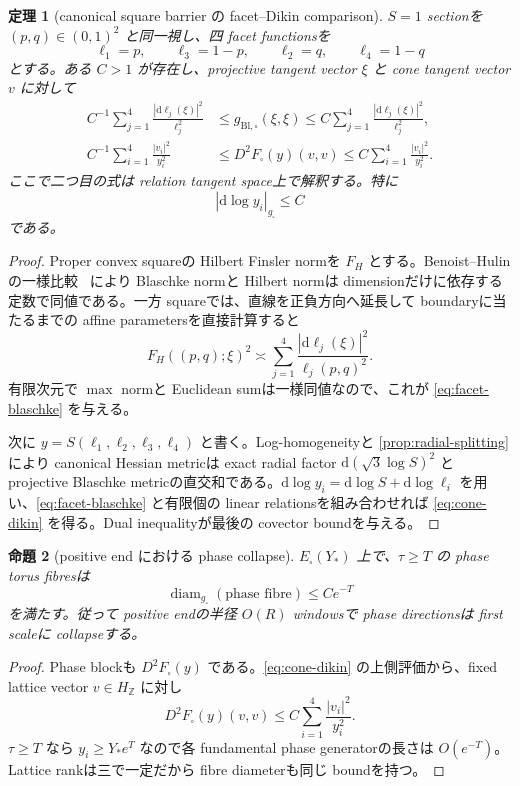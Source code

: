 \documentclass[11pt,a4paper]{ltjsarticle}
\newcommand{\ZZ}{\mathbb Z}\newcommand{\dd}{\mathrm d}\newcommand{\Ric}{\operatorname{Ric}}
\newcommand{\diam}{\operatorname{diam}}\newcommand{\vol}{\operatorname{vol}}
\newcommand{\gsq}{g_{\square}}\newcommand{\omsq}{\omega_{\square}}
\newcommand{\Fbox}{F_{\square}}\newcommand{\ddc}{\sqrt{-1}\,\partial\bar\partial}
\theoremstyle{plain}
\newtheorem{theorem}{定理}[section]\newtheorem{proposition}[theorem]{命題}
\theoremstyle{definition}
\theoremstyle{remark}
\begin{document}
\begin{theorem}[canonical square barrier の facet--Dikin comparison]\label{thm:square-dikin}
$S=1$ sectionを $(p,q)\in(0,1)^2$ と同一視し、四 facet functionsを
\[
 \ell_1=p,\qquad \ell_3=1-p,\qquad
 \ell_2=q,\qquad \ell_4=1-q
\]
とする。ある $C>1$ が存在し、projective tangent vector $\xi$ と cone tangent vector $v$ に対して
\begin{align}
 C^{-1}\sum_{j=1}^4\frac{|\dd\ell_j(\xi)|^2}{\ell_j^2}
 &\le g_{\mathrm{Bl},\square}(\xi,\xi)
 \le C\sum_{j=1}^4\frac{|\dd\ell_j(\xi)|^2}{\ell_j^2},\label{eq:facet-blaschke}\\
 C^{-1}\sum_{i=1}^4\frac{|v_i|^2}{y_i^2}
 &\le D^2\Fbox(y)(v,v)
 \le C\sum_{i=1}^4\frac{|v_i|^2}{y_i^2}.\label{eq:cone-dikin}
\end{align}
ここで二つ目の式は relation tangent space上で解釈する。特に
\[
 |\dd\log y_i|_{\gsq}\le C
\]
である。
\end{theorem}

\begin{proof}
Proper convex squareの Hilbert Finsler normを $F_H$ とする。Benoist--Hulin の一様比較~\cite{BHulin,Tholozan} により Blaschke normと Hilbert normは dimensionだけに依存する定数で同値である。一方 squareでは、直線を正負方向へ延長して boundaryに当たるまでの affine parametersを直接計算すると
\[
 F_H((p,q);\xi)^2\asymp
 \sum_{j=1}^4\frac{|\dd\ell_j(\xi)|^2}{\ell_j(p,q)^2}.
\]
有限次元で $\max$ normと Euclidean sumは一様同値なので、これが \eqref{eq:facet-blaschke} を与える。

次に $y=S(\ell_1,\ell_2,\ell_3,\ell_4)$ と書く。Log-homogeneityと \cref{prop:radial-splitting} により canonical Hessian metricは exact radial factor $\dd(\sqrt3\log S)^2$ と projective Blaschke metricの直交和である。$\dd\log y_i=\dd\log S+\dd\log\ell_i$ を用い、\eqref{eq:facet-blaschke} と有限個の linear relationsを組み合わせれば \eqref{eq:cone-dikin} を得る。Dual inequalityが最後の covector boundを与える。
\end{proof}

\begin{proposition}[positive end における phase collapse]\label{prop:positive-phase-collapse}
$E_{\square}(Y_*)$ 上で、$\tau\ge T$ の phase torus fibresは
\[
 \diam_{\gsq}(\text{phase fibre})\le C e^{-T}
\]
を満たす。従って positive endの半径 $O(R)$ windowsで phase directionsは first scaleに collapseする。
\end{proposition}

\begin{proof}
Phase blockも $D^2\Fbox(y)$ である。\eqref{eq:cone-dikin} の上側評価から、fixed lattice vector $v\in H_{\ZZ}$ に対し
\[
 D^2\Fbox(y)(v,v)\le C\sum_{i=1}^4\frac{|v_i|^2}{y_i^2}.
\]
$\tau\ge T$ なら $y_i\ge Y_*e^T$ なので各 fundamental phase generatorの長さは $O(e^{-T})$。Lattice rankは三で一定だから fibre diameterも同じ boundを持つ。
\end{proof}
\end{document}

